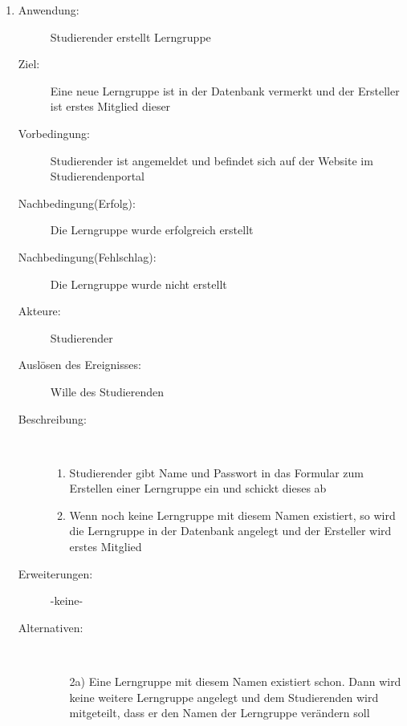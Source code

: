 \documentclass[parskip=full]{scrartcl}
\newcommand{\swtLabel}[1]{\textbf{/#1\arabic*0/}}
\begin{document}
\begin{enumerate}[label=\swtLabel{S}]
  
  \item
  \begin{description}
  \item[Anwendung:] Studierender erstellt Lerngruppe
  \item[Ziel:] Eine neue Lerngruppe ist in der Datenbank vermerkt und der Ersteller ist erstes Mitglied dieser
  	\item[Vorbedingung:] Studierender ist angemeldet und befindet sich auf der
  	Website im Studierendenportal
  	\item[Nachbedingung(Erfolg):] Die Lerngruppe wurde erfolgreich erstellt
  	\item[Nachbedingung(Fehlschlag):] Die Lerngruppe wurde nicht erstellt
  	\item[Akteure:] Studierender
  	\item[Auslösen des Ereignisses:] Wille des Studierenden
  	\item[Beschreibung:]~
  	\begin{enumerate}
  	  \item Studierender gibt Name und Passwort in das Formular zum Erstellen
  	  einer Lerngruppe ein und schickt dieses ab
  	  \item Wenn noch keine Lerngruppe mit diesem Namen existiert, so wird die
  	  Lerngruppe in der Datenbank angelegt und der Ersteller wird erstes Mitglied
  	\end{enumerate}
  	\item[Erweiterungen:] -keine-
  	\item[Alternativen:] ~
  	\begin{enumerate}
  	  \item[2a)] Eine Lerngruppe mit diesem Namen existiert schon. Dann wird
  	  keine weitere Lerngruppe angelegt und dem Studierenden wird mitgeteilt,
  	  dass er den Namen der Lerngruppe verändern soll
  	 \end{enumerate}  
  \end{description}
   

\end{enumerate}
\end{document}

